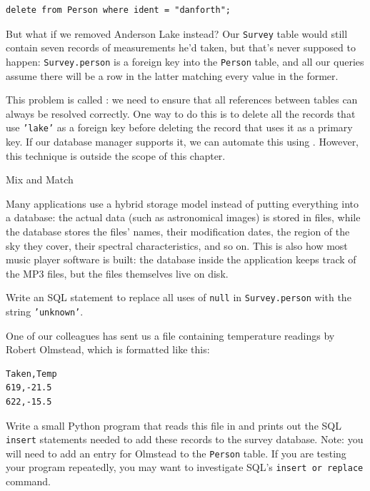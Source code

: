\documentclass{book}
\begin{document}
\begin{verbatim}
delete from Person where ident = "danforth";
\end{verbatim}

But what if we removed Anderson Lake instead? Our \texttt{Survey} table
would still contain seven records of measurements he'd taken, but that's
never supposed to happen: \texttt{Survey.person} is a foreign key into
the \texttt{Person} table, and all our queries assume there will be a
row in the latter matching every value in the former.

This problem is called : we need to ensure that all references between tables can
always be resolved correctly. One way to do this is to delete all the
records that use \texttt{'lake'} as a foreign key before deleting the
record that uses it as a primary key. If our database manager supports
it, we can automate this using . However, this technique is outside the scope of this chapter.

\begin{swcbox}{Mix and Match}

Many applications use a hybrid storage model instead of putting
everything into a database: the actual data (such as astronomical
images) is stored in files, while the database stores the files' names,
their modification dates, the region of the sky they cover, their
spectral characteristics, and so on. This is also how most music player
software is built: the database inside the application keeps track of
the MP3 files, but the files themselves live on disk.

\end{swcbox}

\begin{challenge}
  Write an SQL statement to replace all uses of \texttt{null} in
  \texttt{Survey.person} with the string \texttt{'unknown'}.
\end{challenge}

\begin{challenge}
  One of our colleagues has sent us a  file
  containing temperature readings by Robert Olmstead, which is formatted
  like this:

\begin{verbatim}
Taken,Temp
619,-21.5
622,-15.5
\end{verbatim}

  Write a small Python program that reads this file in and prints out
  the SQL \texttt{insert} statements needed to add these records to the
  survey database. Note: you will need to add an entry for Olmstead to
  the \texttt{Person} table. If you are testing your program repeatedly,
  you may want to investigate SQL's \texttt{insert or replace} command.
\end{challenge}
\end{document}
